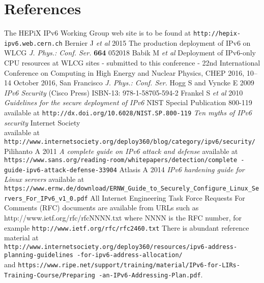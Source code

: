 \section*{References}

\begin{thebibliography}{1}
 The HEPiX IPv6 Working Group web site is to be found at {\tt http://hepix-ipv6.web.cern.ch}
 Bernier J {\it et al} 2015 The production deployment of IPv6 on WLCG  {\it J. Phys.: Conf. Ser.} {\bf664} 052018 
 Babik M {\it et al}  Deployment of IPv6-only CPU resources at WLCG sites - submitted to this conference - 22nd International Conference on Computing in High Energy and Nuclear Physics, CHEP 2016, 10–14 October 2016, San Francisco {\it J. Phys.: Conf. Ser.}
    Hogg S and Vyncke E 2009 {\it IPv6 Security} (Cisco Press) ISBN-13: 978-1-58705-594-2
 Frankel S {\it et al} 2010 {\it Guidelines for the secure deployment of IPv6} NIST Special Publication 800-119 available at {\tt  http://dx.doi.org/10.6028/NIST.SP.800-119}
 {\it Ten myths of IPv6 security} Internet Society \\ available at {\tt http://www.internetsociety.org/deploy360/blog/category/ipv6/security/}
 Pilihanto A 2011 {\it A complete guide on IPv6 attack and defense} available at \hfill \break 
  {\tt https://www.sans.org/reading-room/whitepapers/detection/complete \hfill \break -guide-ipv6-attack-defense-33904}
 Atlasis A 2014 {\it IPv6 hardening guide for Linux servers} available at \\
  {\tt https://www.ernw.de/download/ERNW\_Guide\_to\_Securely\_Configure\_Linux\_Servers\_For\_IPv6\_v1\_0.pdf}
 All Internet Engineering Task Force Requests For Comments (RFC) documents are available
from URLs such as http://www.ietf.org/rfc/rfcNNNN.txt where NNNN is the RFC number, for example {\tt http://www.ietf.org/rfc/rfc2460.txt}
 There is abundant reference material at \\
{\tt http://www.internetsociety.org/deploy360/resources/ipv6-address-planning-guidelines \hfill \break -for-ipv6-address-allocation/} \\
and {\tt https://www.ripe.net/support/training/material/IPv6-for-LIRs-Training-Course/Preparing \hfill \break-an-IPv6-Addressing-Plan.pdf}.
\end{thebibliography}
